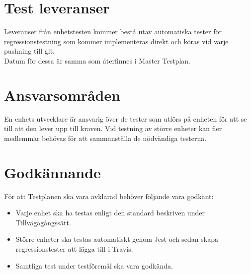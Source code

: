 \documentclass[10pt]{article}
\begin{document}
\section{Test leveranser}

Leveranser från enhetstesten kommer bestå utav automatiska tester för regressionstestning som kommer implementeras direkt och köras vid varje pushning till git. 
\\
Datum för dessa är samma som återfinnes i Master Testplan.



\section{Ansvarsområden}
	En enhets utvecklare är ansvarig över de tester som utförs på enheten för att se till att den lever upp till kraven. Vid testning av större enheter kan fler medlemmar behövas för att sammanställa de nödvändiga testerna.
	
	
	
\section{Godkännande}
	För att Testplanen ska vara avklarad behöver följande vara godkänt:
	\begin{itemize}
	 \item Varje enhet ska ha testas enligt den standard beskriven under Tillvägagångssätt.
	 \item Större enheter ska testas automatiskt genom Jest och sedan skapa regressionstester att lägga till i Travis.
	 \item Samtliga test under testföremål ska vara godkända.
	\end{itemize}
	



\printbibliography
\end{document}
